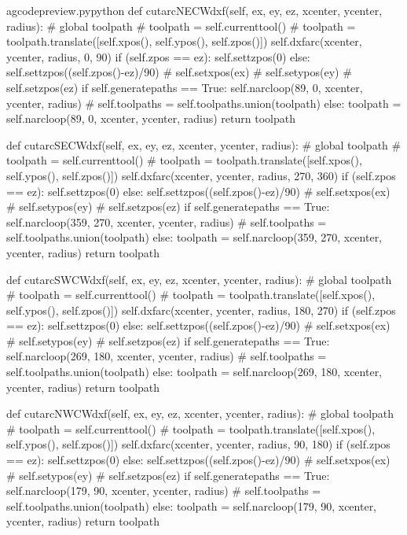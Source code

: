 \documentclass{ltxdoc}
\begin{document}
\begin{writecode}{a}{gcodepreview.py}{python}
    def cutarcNECWdxf(self, ex, ey, ez, xcenter, ycenter, radius):
#        global toolpath
#        toolpath = self.currenttool()
#        toolpath = toolpath.translate([self.xpos(), self.ypos(), self.zpos()])
        self.dxfarc(xcenter, ycenter, radius, 0, 90)
        if (self.zpos == ez):
            self.settzpos(0)
        else:         
            self.settzpos((self.zpos()-ez)/90)
#        self.setxpos(ex)
#        self.setypos(ey)
#        self.setzpos(ez)
        if self.generatepaths == True:
            self.narcloop(89, 0, xcenter, ycenter, radius)
#            self.toolpaths = self.toolpaths.union(toolpath)
        else:
            toolpath = self.narcloop(89, 0, xcenter, ycenter, radius)
            return toolpath

    def cutarcSECWdxf(self, ex, ey, ez, xcenter, ycenter, radius):
#        global toolpath
#        toolpath = self.currenttool()
#        toolpath = toolpath.translate([self.xpos(), self.ypos(), self.zpos()])
        self.dxfarc(xcenter, ycenter, radius, 270, 360)
        if (self.zpos == ez):
            self.settzpos(0)
        else:         
            self.settzpos((self.zpos()-ez)/90)
#        self.setxpos(ex)
#        self.setypos(ey)
#        self.setzpos(ez)
        if self.generatepaths == True:
            self.narcloop(359, 270, xcenter, ycenter, radius)
#            self.toolpaths = self.toolpaths.union(toolpath)
        else:
            toolpath = self.narcloop(359, 270, xcenter, ycenter, radius)
            return toolpath

    def cutarcSWCWdxf(self, ex, ey, ez, xcenter, ycenter, radius):
#        global toolpath
#        toolpath = self.currenttool()
#        toolpath = toolpath.translate([self.xpos(), self.ypos(), self.zpos()])
        self.dxfarc(xcenter, ycenter, radius, 180, 270)
        if (self.zpos == ez):
            self.settzpos(0)
        else:         
            self.settzpos((self.zpos()-ez)/90)
#        self.setxpos(ex)
#        self.setypos(ey)
#        self.setzpos(ez)
        if self.generatepaths == True:
            self.narcloop(269, 180, xcenter, ycenter, radius)
#            self.toolpaths = self.toolpaths.union(toolpath)
        else:
            toolpath = self.narcloop(269, 180, xcenter, ycenter, radius)
            return toolpath

    def cutarcNWCWdxf(self, ex, ey, ez, xcenter, ycenter, radius):
#        global toolpath
#        toolpath = self.currenttool()
#        toolpath = toolpath.translate([self.xpos(), self.ypos(), self.zpos()])
        self.dxfarc(xcenter, ycenter, radius, 90, 180)
        if (self.zpos == ez):
            self.settzpos(0)
        else:         
            self.settzpos((self.zpos()-ez)/90)
#        self.setxpos(ex)
#        self.setypos(ey)
#        self.setzpos(ez)
        if self.generatepaths == True:
            self.narcloop(179, 90, xcenter, ycenter, radius)
#            self.toolpaths = self.toolpaths.union(toolpath)
        else:
            toolpath = self.narcloop(179, 90, xcenter, ycenter, radius)
            return toolpath

\end{writecode}
\addtocounter{gcpy}{154}
\end{document}
